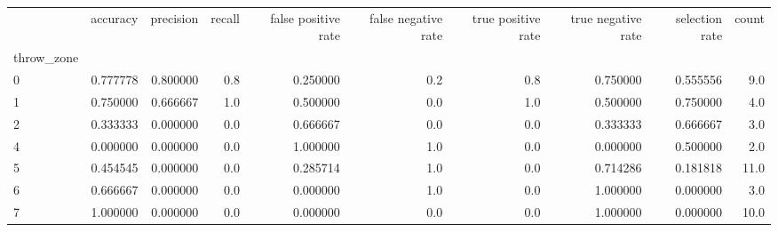 \begin{tabular}{lrrrrrrrrr}
\toprule
{} &  accuracy &  precision &  recall &  false positive rate &  false negative rate &  true positive rate &  true negative rate &  selection rate &  count \\
throw\_zone &           &            &         &                      &                      &                     &                     &                 &        \\
\midrule
0          &  0.777778 &   0.800000 &     0.8 &             0.250000 &                  0.2 &                 0.8 &            0.750000 &        0.555556 &    9.0 \\
1          &  0.750000 &   0.666667 &     1.0 &             0.500000 &                  0.0 &                 1.0 &            0.500000 &        0.750000 &    4.0 \\
2          &  0.333333 &   0.000000 &     0.0 &             0.666667 &                  0.0 &                 0.0 &            0.333333 &        0.666667 &    3.0 \\
4          &  0.000000 &   0.000000 &     0.0 &             1.000000 &                  1.0 &                 0.0 &            0.000000 &        0.500000 &    2.0 \\
5          &  0.454545 &   0.000000 &     0.0 &             0.285714 &                  1.0 &                 0.0 &            0.714286 &        0.181818 &   11.0 \\
6          &  0.666667 &   0.000000 &     0.0 &             0.000000 &                  1.0 &                 0.0 &            1.000000 &        0.000000 &    3.0 \\
7          &  1.000000 &   0.000000 &     0.0 &             0.000000 &                  0.0 &                 0.0 &            1.000000 &        0.000000 &   10.0 \\
\bottomrule
\end{tabular}
